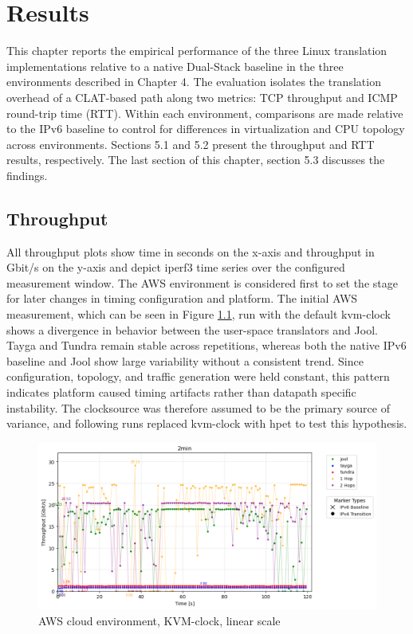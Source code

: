 \chapter{Results}
This chapter reports the empirical performance of the three Linux translation implementations relative to a native Dual-Stack baseline in the three environments described in Chapter 4. The evaluation isolates the translation overhead of a CLAT-based path along two metrics: TCP throughput and ICMP round-trip time (RTT). Within each environment, comparisons are made relative to the IPv6 baseline to control for differences in virtualization and CPU topology across environments. Sections 5.1 and 5.2 present the throughput and RTT results, respectively. The last section of this chapter, section 5.3 discusses the findings.

\section{Throughput}
All throughput plots show time in seconds on the x-axis and throughput in Gbit/s on the y-axis and depict iperf3 time series over the configured measurement window. The AWS environment is considered first to set the stage for later changes in timing configuration and platform.
The initial AWS measurement, which can be seen in Figure \ref{fig:AWS_tcp_sameScale_kvm-clock_linear}, run with the default kvm-clock shows a divergence in behavior between the user-space translators and Jool. Tayga and Tundra remain stable across repetitions, whereas both the native IPv6 baseline and Jool show large variability without a consistent trend. Since configuration, topology, and traffic generation were held constant, this pattern indicates platform caused timing artifacts rather than datapath specific instability. The clocksource was therefore assumed to be the primary source of variance, and following runs replaced kvm-clock with hpet to test this hypothesis.

\begin{figure}[H]
    \centering
    \includegraphics[width=1\textwidth]{resources/finalPlots/combinedplots/AWS_tcp_sameScale_kvm-clock_2min_linear.png}
    \caption{AWS cloud environment, KVM-clock, linear scale}
    \label{fig:AWS_tcp_sameScale_kvm-clock_linear}

\end{figure}


